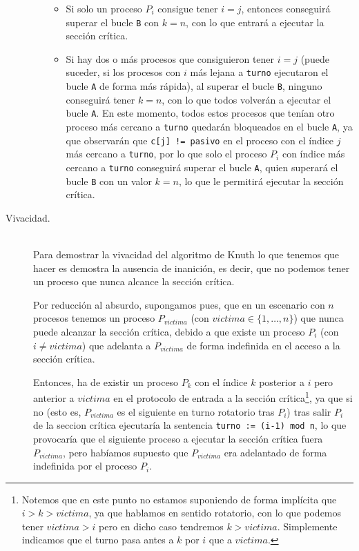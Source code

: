 \begin{description}
\begin{itemize}
\begin{itemize}
                    \item Si solo un proceso $P_i$ consigue tener $i = j$, entonces conseguirá superar el bucle \verb|B| con $k = n$, con lo que entrará a ejecutar la sección crítica.
                    \item Si hay dos o más procesos que consiguieron tener $i = j$ (puede suceder, si los procesos con $i$ más lejana a \verb|turno| ejecutaron el bucle \verb|A| de forma más rápida), al superar el bucle \verb|B|, ninguno conseguirá tener $k = n$, con lo que todos volverán a ejecutar el bucle \verb|A|. En este momento, todos estos procesos que tenían otro proceso más cercano a \verb|turno| quedarán bloqueados en el bucle \verb|A|, ya que observarán que \verb|c[j] != pasivo| en el proceso con el índice $j$ más cercano a \verb|turno|, por lo que solo el proceso $P_i$ con índice más cercano a \verb|turno| conseguirá superar el bucle \verb|A|, quien superará el bucle \verb|B| con un valor $k = n$, lo que le permitirá ejecutar la sección crítica.
                \end{itemize}
        \end{itemize}
    \item [Vivacidad.]~\\
        Para demostrar la vivacidad del algoritmo de Knuth lo que tenemos que hacer es demostra la ausencia de inanición, es decir, que no podemos tener un proceso que nunca alcance la sección crítica.

        Por reducción al absurdo, supongamos pues, que en un escenario con $n$ procesos tenemos un proceso $P_{victima}$ (con $victima \in \{1,\ldots,n\}$) que nunca puede alcanzar la sección crítica, debido a que existe un proceso $P_i$ (con $i\neq victima$) que adelanta a $P_{victima}$ de forma indefinida en el acceso a la sección crítica.

        Entonces, ha de existir un proceso $P_k$ con el índice $k$ posterior a $i$ pero anterior a $victima$ en el protocolo de entrada a la sección crítica\footnote{Notemos que en este punto no estamos suponiendo de forma implícita que $i>k>victima$, ya que hablamos en sentido rotatorio, con lo que podemos tener $victima > i$ pero en dicho caso tendremos $k>victima$. Simplemente indicamos que el turno pasa antes a $k$ por $i$ que a $victima$.}, ya que si no (esto es, $P_{victima}$ es el siguiente en turno rotatorio tras $P_i$) tras salir $P_i$ de la seccion crítica ejecutaría la sentencia \verb|turno := (i-1) mod n|, lo que provocaría que el siguiente proceso a ejecutar la sección crítica fuera $P_{victima}$, pero habíamos supuesto que $P_{victima}$ era adelantado de forma indefinida por el proceso $P_i$.


\end{description}

